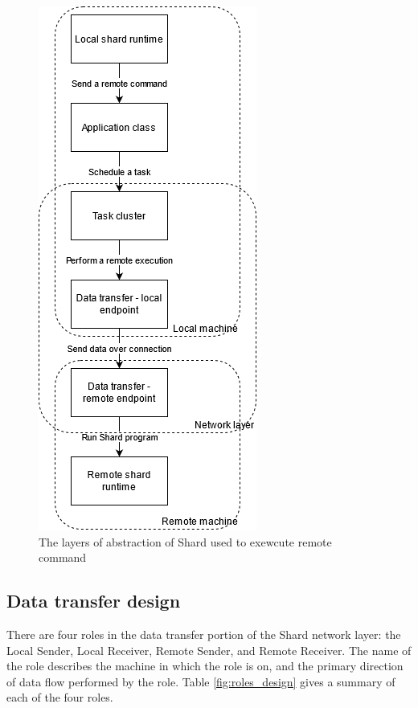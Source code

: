 \documentclass[twoside]{report}
\begin{document}
\begin{figure}[h]
  \begin{center}
    \includegraphics[scale=0.5]{img/shard_network_design.png}
    \caption{The layers of abstraction of Shard used to exewcute remote command}
    \label{fig:network_layer_design}
  \end{center}
\end{figure}

\subsection{Data transfer design}
There are four roles in the data transfer portion of the Shard network layer: the Local Sender, Local Receiver, Remote Sender, and Remote Receiver.
The name of the role describes the machine in which the role is on, and the primary direction of data flow performed by the role.
Table \ref{fig:roles_design} gives a summary of each of the four roles.
\end{document}

